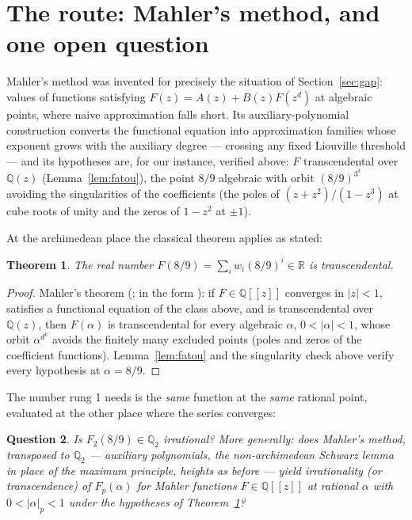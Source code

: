 \documentclass[11pt]{article}
\newtheorem{theorem}{Theorem}[section]
\newtheorem{question}[theorem]{Question}
\theoremstyle{definition}
\newcommand{\Q}{\mathbb{Q}}
\newcommand{\R}{\mathbb{R}}
\newcommand{\Qtwo}{\Q_2}
\begin{document}
\section{The route: Mahler's method, and one open question}
\label{sec:route}

Mahler's method \cite{mahler, nishioka} was invented for precisely
the situation of Section~\ref{sec:gap}: values of functions
satisfying $F(z) = A(z) + B(z) F(z^d)$ at algebraic points, where
naive approximation falls short. Its auxiliary-polynomial
construction converts the functional equation into approximation
families whose exponent grows with the auxiliary degree --- crossing
any fixed Liouville threshold --- and its hypotheses are, for our
instance, verified above: $F$ transcendental over $\Q(z)$
(Lemma~\ref{lem:fatou}), the point $8/9$ algebraic with orbit
$(8/9)^{3^k}$ avoiding the singularities of the coefficients (the
poles of $(z+z^2)/(1-z^3)$ at cube roots of unity and the zeros of
$1 - z^2$ at $\pm 1$).

At the archimedean place the classical theorem applies as stated:

\begin{theorem}\label{thm:arch}
The real number $F(8/9) = \sum_i w_i (8/9)^i \in \R$ is
transcendental.
\end{theorem}

\begin{proof}
Mahler's theorem (\cite{mahler}; in the form
\cite[Ch.~1]{nishioka}): if $F \in \Q[[z]]$ converges in
$|z| < 1$, satisfies a functional equation of the class above, and is
transcendental over $\Q(z)$, then $F(\alpha)$ is transcendental for
every algebraic $\alpha$, $0 < |\alpha| < 1$, whose orbit
$\alpha^{d^k}$ avoids the finitely many excluded points (poles and
zeros of the coefficient functions). Lemma~\ref{lem:fatou} and the
singularity check above verify every hypothesis at $\alpha = 8/9$.
\end{proof}

The number rung 1 needs is the \emph{same} function at the
\emph{same} rational point, evaluated at the other place where the
series converges:

\begin{question}\label{q:main}
Is $F_2(8/9) \in \Qtwo$ irrational? More generally: does Mahler's
method, transposed to $\Qtwo$ --- auxiliary polynomials, the
non-archimedean Schwarz lemma in place of the maximum principle,
heights as before --- yield irrationality (or transcendence) of
$F_p(\alpha)$ for Mahler functions $F \in \Q[[z]]$ at rational
$\alpha$ with $0 < |\alpha|_p < 1$ under the hypotheses of
Theorem~\ref{thm:arch}?
\end{question}
\end{document}
